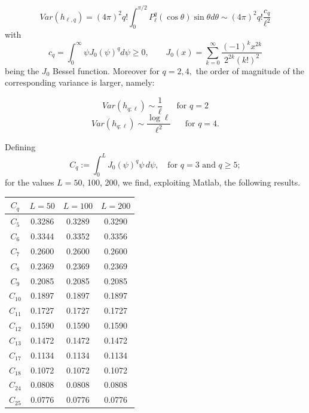 \documentclass[aps,prd,showpacs,superscriptaddress,groupedaddress]{revtex4-1}  %
\begin{document}
$$Var(h_{\ell,q})=(4\pi)^2 q! \int_{0}^{\pi/2} P_\ell^q(\cos \theta )\sin \theta d\theta \sim (4\pi)^2 q! \frac{c_q}{\ell^2} $$
with
\begin{equation}\label{J0}
c_q=\int_{0}^{\infty} \psi J_0(\psi)^q d\psi \geq 0, \mbox{ } \mbox{ }\mbox{ } J_0(x)=\sum_{k=0}^{\infty} \dfrac{(-1)^kx^{2k}}{2^{2k}(k!)^2}
\end{equation} being the $J_0$ Bessel function. Moreover for $q=2,4,$ the order of magnitude of the corresponding variance is larger, namely: 

$$Var(h_{q;\ell}) \sim \frac{1}{\ell} \mbox{  }\mbox{  }\mbox{ for } q=2$$
$$Var(h_{q;\ell}) \sim \frac{\log \ell}{\ell^2}\mbox{  }\mbox{  } \mbox{ for } q=4.$$



Defining $$C_q:=  \int_{0}^{L} J_0(\psi)^q \psi \,d\psi, \mbox{  } \mbox{ for } q=3 \mbox{ and }q\geq 5;$$
for the values $L=50$, 100, 200, we find, exploiting Matlab, the following results.\\

\begin{tabular}{c|c|c|c}
	\textbf{ $C_q$} &\textbf{	$L=50$} & \textbf{$L=100$} & \textbf{$L=200$}\\
	\hline $C_5$ &	0.3286  & 0.3289 & 0.3290\\
	\hline $C_6$ &	0.3344  & 0.3352 & 0.3356\\
	\hline $C_7$ &	0.2600  & 0.2600 & 0.2600\\
	\hline $C_8$ &	0.2369 & 0.2369& 0.2369\\
	\hline $C_9$ &	0.2085  & 0.2085 & 0.2085\\
	\hline $C_{10}$ & 0.1897 & 0.1897&	0.1897\\
	\hline $C_{11}$ &	0.1727  & 0.1727 & 0.1727\\
	\hline $C_{12}$	& 0.1590 & 0.1590 & 0.1590 \\
	\hline $C_{13}$	& 0.1472 & 0.1472 & 0.1472 \\
	\hline $C_{17}$	& 0.1134 & 0.1134 & 0.1134 \\
	\hline $C_{18}$	& 0.1072 & 0.1072 & 0.1072 \\
	\hline $C_{24}$	& 0.0808 & 0.0808 & 0.0808 \\
	\hline $C_{25}$	& 0.0776 & 0.0776 & 0.0776 \\
\end{tabular}\\
\end{document}
